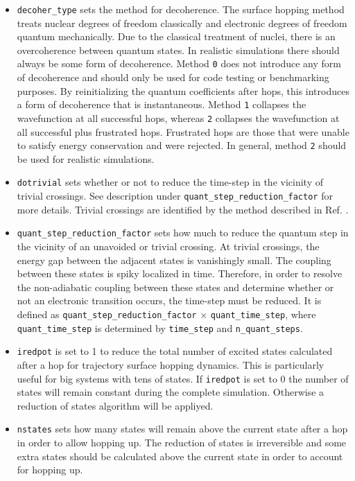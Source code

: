 \begin{itemize}
\item \verb+decoher_type+ sets the method for decoherence.  The surface hopping method treats nuclear degrees of freedom classically and electronic degrees of freedom quantum mechanically.  Due to the classical treatment of nuclei, there is an overcoherence between quantum states.  In realistic simulations there should always be some form of decoherence.  Method \verb+0+ does not introduce any form of decoherence and should only be used for code testing or benchmarking purposes.  By reinitializing the quantum coefficients after hops, this introduces a form of decoherence that is instantaneous.  Method \verb+1+ collapses the wavefunction at all successful hops, whereas \verb+2+ collapses the wavefunction at all successful plus frustrated hops.  Frustrated hops are those that were unable to satisfy energy conservation and were rejected.  In general, method \verb+2+ should be used for realistic simulations.
\item \verb+dotrivial+ sets whether or not to reduce the time-step in the vicinity of trivial crossings.  See description under \verb+quant_step_reduction_factor+ for more details.  Trivial crossings are identified by the method described in Ref. \cite{fernandez2012identification}.
\item \verb+quant_step_reduction_factor+ sets how much to reduce the quantum step in the vicinity of an unavoided or trivial crossing.  At trivial crossings, the energy gap between the adjacent states is vanishingly small.  The coupling between these states is spiky localized in time.  Therefore, in order to resolve the non-adiabatic coupling between these states and determine whether or not an electronic transition occurs, the time-step must be reduced.  It is defined as \verb+quant_step_reduction_factor+ $\times$ \verb+quant_time_step+, where \verb+quant_time_step+ is determined by \verb+time_step+ and \verb+n_quant_steps+.
\item \verb+iredpot+ is set to 1 to reduce the total number of excited states calculated after a hop for trajectory surface hopping dynamics. This is particularly useful for big systems with tens of states. If \verb+iredpot+ is set to 0 the number of states will remain constant during the complete simulation. Otherwise a reduction of states algorithm will be appliyed. \cite{nelson2016nonadiabatic}
\item \verb+nstates+ sets how many states will remain above the current state after a hop in order to allow hopping up. The reduction of states is irreversible and some extra states should be calculated above the current state in order to account for hopping up.
\end{itemize}

